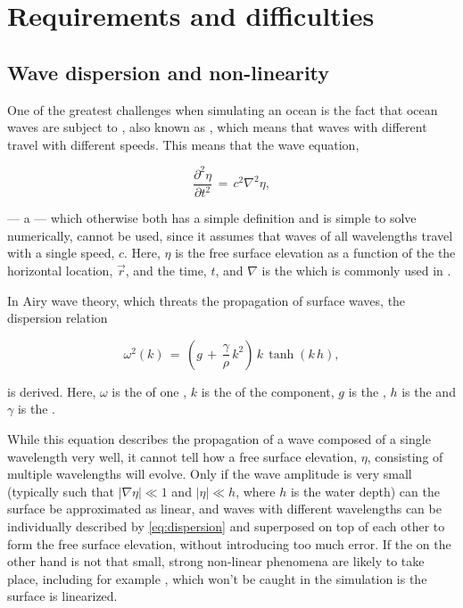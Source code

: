 \chapter{Requirements and difficulties}
\label{chap:requirementsanddifficulties}

\section{Wave dispersion and non-linearity}

One of the greatest challenges when simulating an ocean is the fact that ocean waves are subject to , also known as , which means that waves with different \wavelengths travel with different speeds. This means that the wave equation,

\begin{equation} \label{eq:wave_equation}
\frac{\partial^2 \eta}{\partial t^2} \,=\, c^2\nabla^2\eta,
\end{equation}

--- a \PDE\xspace --- which otherwise both has a simple definition and is simple to solve numerically, cannot be used, since it assumes that waves of all wavelengths travel with a single speed, $c$. Here, $\eta$ is the free surface elevation as a function of the the horizontal location, $\vec{r}$, and the time, $t$, and $\nabla$ is the  which is commonly used in .

In Airy wave theory, which threats the propagation of surface waves, the dispersion relation

\begin{equation} \label{eq:dispersion}
\omega^2(k) \,=\, \left(g\,+\,\frac{\gamma}{\rho}\,k^2\right)\,k\,\tanh(k\,h),
\end{equation}

is derived. Here, $\omega$ is the  of one , $k$ is the  of the component, $g$ is the , $h$ is the  and $\gamma$ is the .

While this equation describes the propagation of a wave composed of a single wavelength very well, it cannot tell how a free surface elevation, $\eta$, consisting of multiple wavelengths will evolve. Only if the wave amplitude is very small (typically such that $|\nabla\eta| \ll 1$ and $|\eta| \ll h$, where $h$ is the water depth) can the surface be approximated as linear, and waves with different wavelengths can be individually described by \eqref{eq:dispersion} and superposed on top of each other to form the free surface elevation, without introducing too much error. If the  on the other hand is not that small, strong non-linear phenomena are likely to take place, including for example , which won't be caught in the simulation is the surface is linearized.

